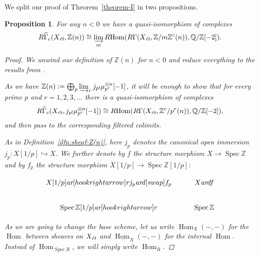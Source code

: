 \documentclass[leqno,12pt]{article}
\theoremstyle{plain}
\newtheorem{proposition}[theorem]{\indent\sc Proposition}
\theoremstyle{definition}
\DeclareMathOperator{\Spec}{Spec}
\DeclareMathOperator{\Hom}{Hom}
\newcommand{\QQ}{\mathbb{Q}}
\newcommand{\ZZ}{\mathbb{Z}}
\newcommand{\dfn}{\mathrel{\mathop:}=}
\newcommand{\ar}{\text{\it ar}}
\newcommand{\et}{\text{\it \'{e}t}}
\newcommand{\iHom}{\underline{\Hom}}
\newcommand{\RHom}{R\!\Hom}
\begin{document}
We split our proof of Theorem~\ref{theorem-I} in two propositions.

\begin{proposition}
  For any $n < 0$ we have a quasi-isomorphism of complexes
  \begin{equation}
    \label{eqn:duality-quasi-isomorphism-1}
    R\widehat{\Gamma}_c (X_\et, \ZZ (n)) \cong
    \varinjlim_m \RHom (R\Gamma (X_\et, \ZZ/m\ZZ^c (n)), \QQ/\ZZ [-2]).
  \end{equation}

  \begin{proof}
    We unwind our definition of $\ZZ (n)$ for $n < 0$ and reduce everything to
    the results from \cite{Geisser-2010}.

    \vspace{1em}

    As we have
    $\ZZ (n) \dfn \bigoplus_p \varinjlim_r j_{p!} \mu_{p^r}^{\otimes n} [-1]$,
    it will be enough to show that for every prime $p$ and $r=1,2,3,\ldots$
    there is a quasi-isomorphism of complexes
    \[ R\widehat{\Gamma}_c (X_\et, j_{p!} \mu_{p^r}^{\otimes n} [-1]) \cong
    \RHom (R\Gamma (X_\et, \ZZ^c/p^r (n)), \QQ/\ZZ [-2]), \]
    and then pass to the corresponding filtered colimits.

    As in Definition~\ref{dfn:sheaf-Z(n)}, here $j_p$ denotes the canonical open
    immersion $j_p\colon X[1/p] \hookrightarrow X$. We further denote by $f$ the
    structure morphism $X\to \Spec \ZZ$ and by $f_p$ the structure morphism
    $X [1/p] \to \Spec \ZZ [1/p]$:

    \[ \begin{tikzcd}
      X [1/p]\ar[hookrightarrow]{r}{j_p}\ar{d}[swap]{f_p} & X\ar{d}{f} \\
      \Spec \ZZ [1/p]\ar[hookrightarrow]{r} & \Spec \ZZ
    \end{tikzcd} \]

    As we are going to change the base scheme, let us write $\Hom_X (-,-)$ for
    the $\Hom$ between sheaves on $X_\et$ and $\iHom_X (-,-)$ for the
    internal $\Hom$. Instead of $\Hom_{\Spec R}$, we will simply write
    $\Hom_R$.


\end{proof}
\end{proposition}
\end{document}
